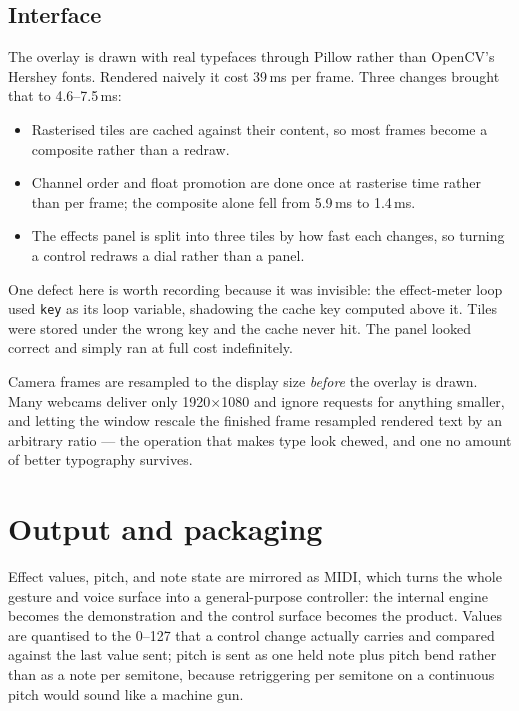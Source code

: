 \documentclass[a4paper,10pt,twocolumn]{article}
\newcommand{\code}[1]{\texttt{\small #1}}
\begin{document}
\subsection{Interface}

The overlay is drawn with real typefaces through Pillow rather than OpenCV's
Hershey fonts. Rendered naively it cost 39\,ms per frame. Three changes brought
that to 4.6--7.5\,ms:

\begin{itemize}\itemsep2pt
\item Rasterised tiles are cached against their content, so most frames become
      a composite rather than a redraw.
\item Channel order and float promotion are done once at rasterise time rather
      than per frame; the composite alone fell from 5.9\,ms to 1.4\,ms.
\item The effects panel is split into three tiles by how fast each changes, so
      turning a control redraws a dial rather than a panel.
\end{itemize}

One defect here is worth recording because it was invisible: the effect-meter
loop used \code{key} as its loop variable, shadowing the cache key computed
above it. Tiles were stored under the wrong key and the cache never hit. The
panel looked correct and simply ran at full cost indefinitely.

Camera frames are resampled to the display size \emph{before} the overlay is
drawn. Many webcams deliver only 1920$\times$1080 and ignore requests for
anything smaller, and letting the window rescale the finished frame resampled
rendered text by an arbitrary ratio --- the operation that makes type look
chewed, and one no amount of better typography survives.

\section{Output and packaging}

Effect values, pitch, and note state are mirrored as MIDI, which turns the
whole gesture and voice surface into a general-purpose controller: the internal
engine becomes the demonstration and the control surface becomes the product.
Values are quantised to the 0--127 that a control change actually carries and
compared against the last value sent; pitch is sent as one held note plus pitch
bend rather than as a note per semitone, because retriggering per semitone on a
continuous pitch would sound like a machine gun.
\end{document}
